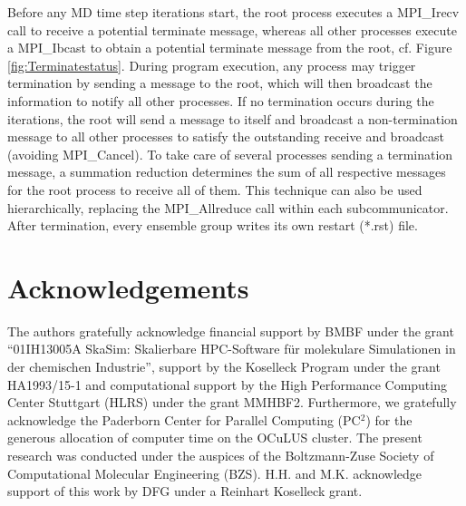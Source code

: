 \documentclass[preprint,12pt]{elsarticle}
\begin{document}
Before any MD time step iterations start, the root process executes a MPI\_Irecv call to receive a potential terminate message,
whereas all other processes execute a MPI\_Ibcast to obtain a potential terminate message from the root, cf. Figure \ref{fig:Terminatestatus}.
During program execution, any process may trigger termination by sending a message to the root, which will then broadcast the information to notify all other processes.
If no termination occurs during the iterations, the root will send a message to itself and broadcast a non-termination message to all other processes to satisfy
the outstanding receive and broadcast (avoiding MPI\_Cancel). 
To take care of several processes sending a termination message, a summation reduction determines the sum of all
respective messages for the root process to receive all of them.
This technique can also be used hierarchically, replacing the MPI\_Allreduce call within each subcommunicator.
After termination, every ensemble group writes its own restart (*.rst) file.


\section*{Acknowledgements}
The authors gratefully acknowledge financial support by BMBF under the grant ``01IH13005A SkaSim: Skalierbare HPC-Software f\"ur molekulare Simulationen in der chemischen Industrie'', support by the Koselleck Program under the grant HA1993/15-1 and computational support by the High Performance Computing Center Stuttgart (HLRS) under the grant MMHBF2. Furthermore, we gratefully acknowledge the Paderborn Center for Parallel Computing
(PC$^2$) for the generous allocation of computer time on the OCuLUS cluster. The present research was conducted under the auspices of the Boltzmann-Zuse Society of Computational Molecular Engineering (BZS). H.H. and M.K. acknowledge support of this work by DFG under a Reinhart Koselleck grant.




\newpage







\end{document}
